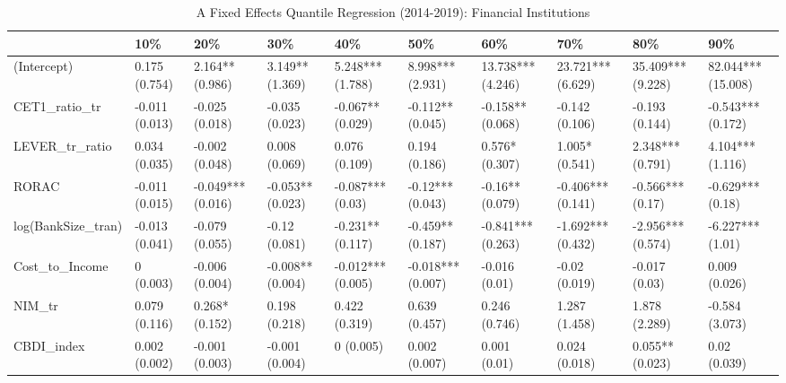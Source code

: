\begin{table}[ht]
\centering
\caption{A Fixed Effects Quantile Regression (2014-2019): Financial Institutions} 
\begingroup\small
\begin{tabular}{llllllllll}
  \toprule
 & 10\% & 20\% & 30\% & 40\% & 50\% & 60\% & 70\% & 80\% & 90\% \\ 
  \midrule
(Intercept) & 0.175 (0.754) & 2.164** (0.986) & 3.149** (1.369) & 5.248*** (1.788) & 8.998*** (2.931) & 13.738*** (4.246) & 23.721*** (6.629) & 35.409*** (9.228) & 82.044*** (15.008) \\ 
  CET1\_ratio\_tr & -0.011 (0.013) & -0.025 (0.018) & -0.035 (0.023) & -0.067** (0.029) & -0.112** (0.045) & -0.158** (0.068) & -0.142 (0.106) & -0.193 (0.144) & -0.543*** (0.172) \\ 
  LEVER\_tr\_ratio & 0.034 (0.035) & -0.002 (0.048) & 0.008 (0.069) & 0.076 (0.109) & 0.194 (0.186) & 0.576* (0.307) & 1.005* (0.541) & 2.348*** (0.791) & 4.104*** (1.116) \\ 
  RORAC & -0.011 (0.015) & -0.049*** (0.016) & -0.053** (0.023) & -0.087*** (0.03) & -0.12*** (0.043) & -0.16** (0.079) & -0.406*** (0.141) & -0.566*** (0.17) & -0.629*** (0.18) \\ 
  log(BankSize\_tran) & -0.013 (0.041) & -0.079 (0.055) & -0.12 (0.081) & -0.231** (0.117) & -0.459** (0.187) & -0.841*** (0.263) & -1.692*** (0.432) & -2.956*** (0.574) & -6.227*** (1.01) \\ 
  Cost\_to\_Income & 0 (0.003) & -0.006 (0.004) & -0.008** (0.004) & -0.012*** (0.005) & -0.018*** (0.007) & -0.016 (0.01) & -0.02 (0.019) & -0.017 (0.03) & 0.009 (0.026) \\ 
  NIM\_tr & 0.079 (0.116) & 0.268* (0.152) & 0.198 (0.218) & 0.422 (0.319) & 0.639 (0.457) & 0.246 (0.746) & 1.287 (1.458) & 1.878 (2.289) & -0.584 (3.073) \\ 
  CBDI\_index & 0.002 (0.002) & -0.001 (0.003) & -0.001 (0.004) & 0 (0.005) & 0.002 (0.007) & 0.001 (0.01) & 0.024 (0.018) & 0.055** (0.023) & 0.02 (0.039) \\ 
   \bottomrule
\end{tabular}
\endgroup
\end{table}
